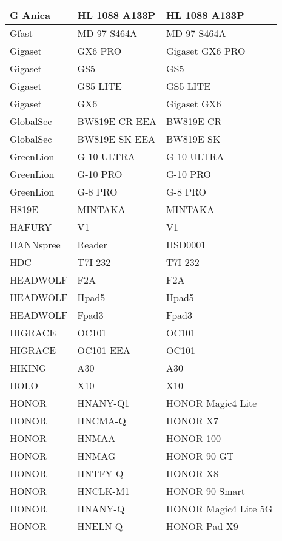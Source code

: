 \begin{tabularx}{\linewidth}{|l|X|X|}
        G Anica & HL 1088 A133P & HL 1088 A133P \\ \hline
        Gfast & MD 97 S464A & MD 97 S464A \\ \hline
        Gigaset & GX6 PRO & Gigaset GX6 PRO \\ \hline
        Gigaset & GS5 & GS5 \\ \hline
        Gigaset & GS5 LITE & GS5 LITE \\ \hline
        Gigaset & GX6 & Gigaset GX6 \\ \hline
        GlobalSec & BW819E CR EEA & BW819E CR \\ \hline
        GlobalSec & BW819E SK EEA & BW819E SK \\ \hline
        GreenLion & G-10 ULTRA & G-10 ULTRA \\ \hline
        GreenLion & G-10 PRO & G-10 PRO \\ \hline
        GreenLion & G-8 PRO & G-8 PRO \\ \hline
        H819E & MINTAKA & MINTAKA \\ \hline
        HAFURY & V1 & V1 \\ \hline
        HANNspree & Reader & HSD0001 \\ \hline
        HDC & T7I 232 & T7I 232 \\ \hline
        HEADWOLF & F2A & F2A \\ \hline
        HEADWOLF & Hpad5 & Hpad5 \\ \hline
        HEADWOLF & Fpad3 & Fpad3 \\ \hline
        HIGRACE & OC101 & OC101 \\ \hline
        HIGRACE & OC101 EEA & OC101 \\ \hline
        HIKING & A30 & A30 \\ \hline
        HOLO & X10 & X10 \\ \hline
        HONOR & HNANY-Q1 & HONOR Magic4 Lite \\ \hline
        HONOR & HNCMA-Q & HONOR X7 \\ \hline
        HONOR & HNMAA & HONOR 100 \\ \hline
        HONOR & HNMAG & HONOR 90 GT \\ \hline
        HONOR & HNTFY-Q & HONOR X8 \\ \hline
        HONOR & HNCLK-M1 & HONOR 90 Smart \\ \hline
        HONOR & HNANY-Q & HONOR Magic4 Lite 5G \\ \hline
        HONOR & HNELN-Q & HONOR Pad X9 \\ \hline

\end{tabularx}
